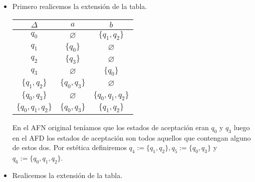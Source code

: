     \begin{itemize}[label={✎}]
        \item Primero realicemos la extensión de la tabla.
        \begin{center}
         \begin{tabular}{|c|c|c|}
        \hline
        $\Delta$ & $a$ & $b$\\
        \hline 
        $q_0$ & $\varnothing$ & $\{q_1,q_2\}$ \\ 
        \hline
        $q_1$ &$\{q_0\}$ &$\varnothing$ \\ 
        \hline
        $q_2$& $\{q_3\}$& $\varnothing$ \\ 
        \hline
        $q_3$&$\varnothing$&$\{q_0\}$\\ 
        \hline
        \hline  
        $\{q_1,q_2\}$&$\{q_0,q_3\}$&$\varnothing$\\ 
        \hline
        $\{q_0,q_3\}$&$\varnothing$&$\{q_0,q_1,q_2\}$\\
        \hline
        $\{q_0,q_1,q_2\}$&$\{q_0,q_3\}$&$\{q_1,q_2\}$\\ 
        \hline
        \end{tabular}   
        \end{center}
        En el AFN original teníamos que los estados de aceptación eran $q_0$ y $q_3$ luego en el AFD los estados de aceptación son todos aquellos que contengan alguno de estos dos. Por  estética definiremos $q_4:=\{q_1,q_2\},q_5:=\{q_0,q_3\}$ y $q_6:=\{q_0,q_1,q_2\}$. 
        \begin{center}
        \end{center}

        \item Realicemos la extensión de la tabla.


\end{itemize}
